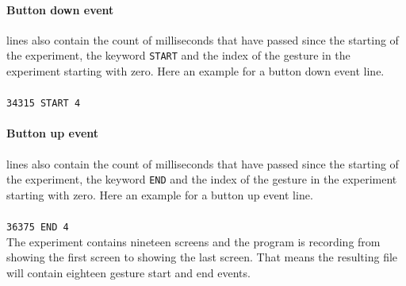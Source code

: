 \documentclass[runningheads,a4paper]{llncs}
\begin{document}
    \paragraph{Button down event} lines also contain the count of milliseconds that have passed since the starting
    of the experiment, the keyword \verb+START+ and the index of the gesture in the experiment starting with zero. Here
    an example for a button down event line.\\\\
    \verb+34315 START 4+

    \paragraph{Button up event} lines also contain the count of milliseconds that have passed since the starting
    of the experiment, the keyword \verb+END+ and the index of the gesture in the experiment starting with zero. Here
    an example for a button up event line.\\\\
    \verb+36375 END 4+\\

    The experiment contains nineteen screens and the program is recording from showing the first screen to showing the
    last screen. That means the resulting file will contain eighteen gesture start and end events.



\end{document}
